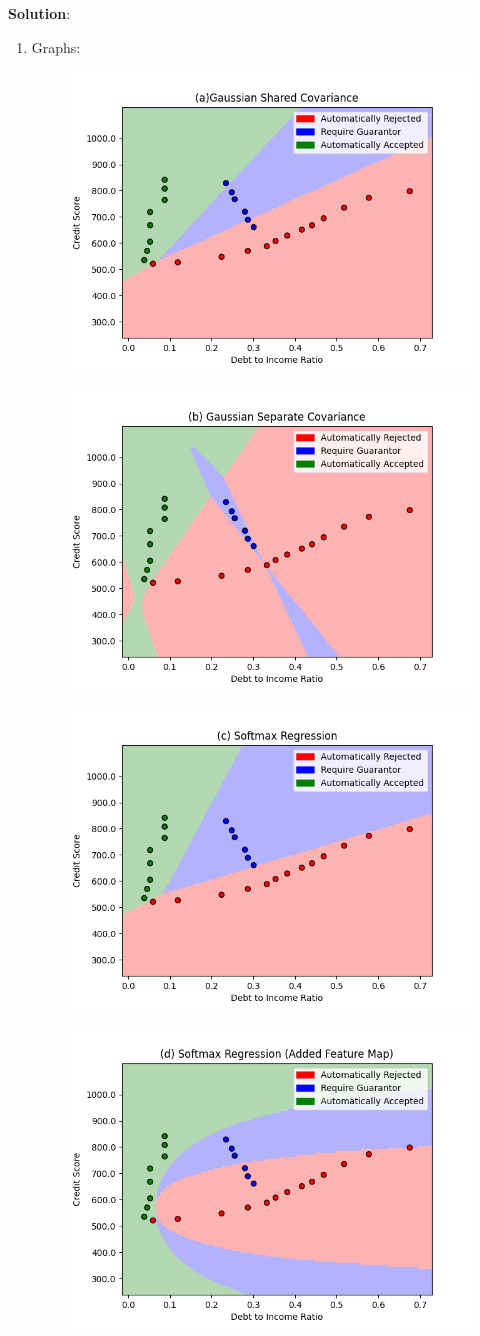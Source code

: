 \documentclass[submit]{../harvardml}
\newenvironment{solution}{
    \vspace{2mm}
    \color{blue}\noindent\textbf{Solution}:
}{}
\begin{document}
\begin{solution}

\begin{enumerate}
    \item Graphs:

\begin{figure}[H]
    \centering
    \includegraphics[width=0.5\linewidth]{hw2/(a)Gaussian Shared Covariance.png}
\end{figure}
\begin{figure}[H]
    \centering
    \includegraphics[width=0.5\linewidth]{hw2/(b) Gaussian Separate Covariance.png}
\end{figure}
\begin{figure}[H]
    \centering
    \includegraphics[width=0.5\linewidth]{hw2/(c) Softmax Regression.png}
\end{figure}
\begin{figure}[H]
    \centering
    \includegraphics[width=0.5\linewidth]{hw2/(d) Softmax Regression (Added Feature Map).png}

\end{figure}
\end{enumerate}
\end{solution}
\end{document}
